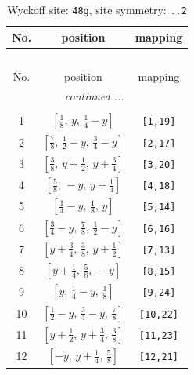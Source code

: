 \documentclass[fleqn,8pt]{jsarticle}
\begin{document}
\begin{longtable}{ccc}
\caption{Wyckoff site: {\tt 48g}, site symmetry: {\tt ..2}}
 \\
 \hline \hline
No. & position & mapping \\ \hline \endfirsthead

\multicolumn{2}{l}{\tablename\ \thetable{}} \\
 \hline \hline
No. & position & mapping \\ \hline \endhead

 \hline \hline
\multicolumn{2}{r}{\footnotesize\it continued ...} \\ \endfoot

 \hline \hline
\multicolumn{2}{r}{} \\ \endlastfoot

1 & $\left[ \frac{1}{8},\, y,\, \frac{1}{4} - y \right]$ & {\tt [1,19]} \\ \hline
2 & $\left[ \frac{7}{8},\, \frac{1}{2} - y,\, \frac{3}{4} - y \right]$ & {\tt [2,17]} \\ \hline
3 & $\left[ \frac{3}{8},\, y + \frac{1}{2},\, y + \frac{3}{4} \right]$ & {\tt [3,20]} \\ \hline
4 & $\left[ \frac{5}{8},\, - y,\, y + \frac{1}{4} \right]$ & {\tt [4,18]} \\ \hline
5 & $\left[ \frac{1}{4} - y,\, \frac{1}{8},\, y \right]$ & {\tt [5,14]} \\ \hline
6 & $\left[ \frac{3}{4} - y,\, \frac{7}{8},\, \frac{1}{2} - y \right]$ & {\tt [6,16]} \\ \hline
7 & $\left[ y + \frac{3}{4},\, \frac{3}{8},\, y + \frac{1}{2} \right]$ & {\tt [7,13]} \\ \hline
8 & $\left[ y + \frac{1}{4},\, \frac{5}{8},\, - y \right]$ & {\tt [8,15]} \\ \hline
9 & $\left[ y,\, \frac{1}{4} - y,\, \frac{1}{8} \right]$ & {\tt [9,24]} \\ \hline
10 & $\left[ \frac{1}{2} - y,\, \frac{3}{4} - y,\, \frac{7}{8} \right]$ & {\tt [10,22]} \\ \hline
11 & $\left[ y + \frac{1}{2},\, y + \frac{3}{4},\, \frac{3}{8} \right]$ & {\tt [11,23]} \\ \hline
12 & $\left[ - y,\, y + \frac{1}{4},\, \frac{5}{8} \right]$ & {\tt [12,21]} \\
\end{longtable}
\renewcommand{\arraystretch}{1.2}
\end{document}
